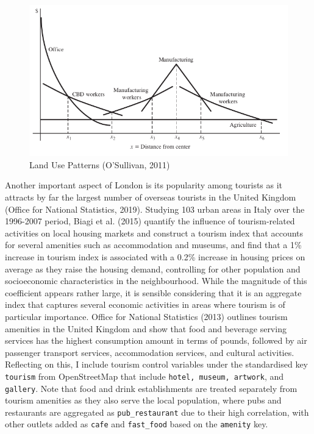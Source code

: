 \documentclass{article}
\begin{document}
\begin{figure}[t]
  \centering
  \includegraphics[width=0.8\linewidth]{images/land-use-patterns.png}
  \caption{Land Use Patterns (O'Sullivan, 2011)}
  \label{fig:landuse}
\end{figure}

Another important aspect of London is its popularity among tourists as it attracts by far the largest number of overseas tourists in the United Kingdom (Office for National Statistics, 2019). Studying 103 urban areas in Italy over the 1996-2007 period, Biagi et al. (2015) quantify the influence of tourism-related activities on local housing markets and construct a tourism index that accounts for several amenities such as accommodation and museums, and find that a 1\% increase in tourism index is associated with a 0.2\% increase in housing prices on average as they raise the housing demand, controlling for other population and socioeconomic characteristics in the neighbourhood. While the magnitude of this coefficient appears rather large, it is sensible considering that it is an aggregate index that captures several economic activities in areas where tourism is of particular importance. Office for National Statistics (2013) outlines tourism amenities in the United Kingdom and show that food and beverage serving services has the highest consumption amount in terms of pounds, followed by air passenger transport services, accommodation services, and cultural activities. Reflecting on this, I include tourism control variables under the standardised key \texttt{tourism} from OpenStreetMap that include \texttt{hotel, museum, artwork}, and \texttt{gallery}. Note that food and drink establishments are treated separately from tourism amenities as they also serve the local population, where pubs and restaurants are aggregated as \texttt{pub\_restaurant} due to their high correlation, with other outlets added as \texttt{cafe} and \texttt{fast\_food} based on the \texttt{amenity} key.
\end{document}
